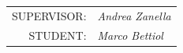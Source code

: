 \begin{titlepage}
    \begin{flushright}\vskip4.0cm 
    \begin{tabular}{rl}
            \rm\large \uppercase{Supervisor:} &\emph{Andrea Zanella}\\
	   \rm\large \uppercase{Student:} &\emph{Marco Bettiol} \\
		\end{tabular}
		\end{flushright}
    \vfill
          \begin{center}
           \end{center}
    
\end{titlepage}

\newpage


